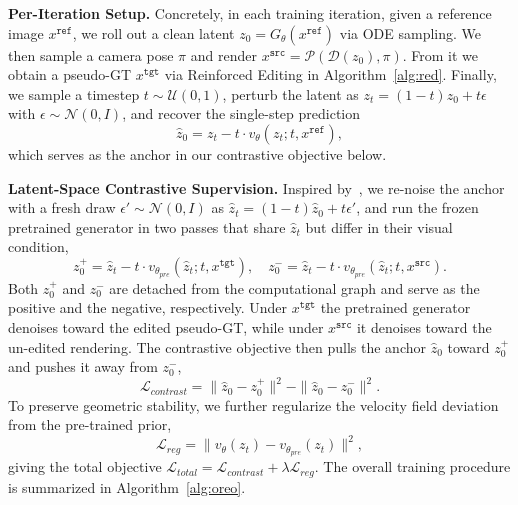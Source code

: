 \documentclass[runningheads]{llncs}
\begin{document}
\textbf{Per-Iteration Setup.}
Concretely, in each training iteration, given a reference image $x^{\texttt{ref}}$, we roll out a clean latent $z_0 = G_\theta(x^{\texttt{ref}})$ via ODE sampling.
We then sample a camera pose $\pi$ and render $x^{\texttt{src}} = \mathcal{P}(\mathcal{D}(z_0), \pi)$.
From it we obtain a pseudo-GT $x^{\texttt{tgt}}$ via Reinforced Editing in Algorithm~\ref{alg:red}.
Finally, we sample a timestep $t \sim \mathcal{U}(0,1)$, perturb the latent as $z_t = (1-t)z_0 + t\epsilon$ with $\epsilon \sim \mathcal{N}(0,I)$, and recover the single-step prediction
\begin{equation}
\hat{z}_0 = z_t - t \cdot v_\theta(z_t; t, x^{\texttt{ref}}),
\end{equation}
which serves as the anchor in our contrastive objective below.

\textbf{Latent-Space Contrastive Supervision.}
Inspired by~\cite{yu2026self}, we re-noise the anchor with a fresh draw $\epsilon' \sim \mathcal{N}(0,I)$ as $\hat{z}_t = (1-t)\hat{z}_0 + t\epsilon'$, and run the frozen pretrained generator in two passes that share $\hat{z}_t$ but differ in their visual condition,
\begin{equation}
\label{eq:contrast_pos_neg}
z_0^{+} = \hat{z}_t - t \cdot v_{\theta_{pre}}(\hat{z}_t; t, x^{\texttt{tgt}}),
\quad
z_0^{-} = \hat{z}_t - t \cdot v_{\theta_{pre}}(\hat{z}_t; t, x^{\texttt{src}}).
\end{equation}
Both $z_0^{+}$ and $z_0^{-}$ are detached from the computational graph and serve as the positive and the negative, respectively. Under $x^{\texttt{tgt}}$ the pretrained generator denoises toward the edited pseudo-GT, while under $x^{\texttt{src}}$ it denoises toward the un-edited rendering.
The contrastive objective then pulls the anchor $\hat{z}_0$ toward $z_0^{+}$ and pushes it away from $z_0^{-}$,
\begin{equation}
\label{eq:contrast_loss}
\mathcal{L}_{contrast} = \| \hat{z}_0 - z_0^{+} \|^2 - \| \hat{z}_0 - z_0^{-} \|^2.
\end{equation}
To preserve geometric stability, we further regularize the velocity field deviation from the pre-trained prior,
\begin{equation}
\mathcal{L}_{reg} = \| v_\theta(z_t) - v_{\theta_{pre}}(z_t) \|^2,
\end{equation}
giving the total objective $\mathcal{L}_{total} = \mathcal{L}_{contrast} + \lambda \mathcal{L}_{reg}$.
The overall training procedure is summarized in Algorithm~\ref{alg:oreo}.
\end{document}
